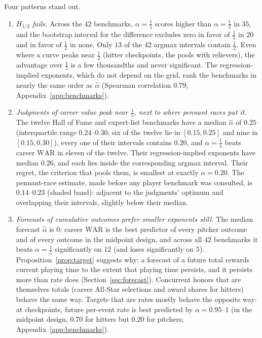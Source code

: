 \documentclass[11pt,letterpaper]{article}
\theoremstyle{plain}
\theoremstyle{definition}
\theoremstyle{remark}
\newcommand{\WAR}{\mathrm{WAR}}
\begin{document}
Four patterns stand out.
\begin{enumerate}
    \item \emph{$H_{1/2}$ fails.} Across the $42$ benchmarks, $\alpha = \tfrac15$ scores higher than $\alpha = \tfrac12$ in $35$, and the bootstrap interval for the difference excludes zero in favor of $\tfrac15$ in $20$ and in favor of $\tfrac12$ in none. Only $13$ of the $42$ argmax intervals contain $\tfrac12$. Even where a curve peaks near $\tfrac12$ (hitter checkpoints, the pools with relievers), the advantage over $\tfrac15$ is a few thousandths and never significant. The regression-implied exponents, which do not depend on the grid, rank the benchmarks in nearly the same order as $\hat\alpha$ (Spearman correlation $0.79$; Appendix~\ref{app:benchmarks}).
    \item \emph{Judgments of career value peak near $\tfrac15$, next to where pennant races put it.} The twelve Hall of Fame and expert-list benchmarks have a median $\hat\alpha$ of $0.25$ (interquartile range $0.24$--$0.30$; six of the twelve lie in $[0.15, 0.25]$ and nine in $[0.15, 0.30]$), every one of their intervals contains $0.20$, and $\alpha = \tfrac15$ beats career $\WAR$ in eleven of the twelve. Their regression-implied exponents have median $0.26$, and each lies inside the corresponding argmax interval. Their regret, the criterion that pools them, is smallest at exactly $\alpha = 0.20$. The pennant-race estimate, made before any player benchmark was consulted, is $0.14$--$0.23$ (shaded band): adjacent to the judgments' optimum and overlapping their intervals, slightly below their median.
    \item \emph{Forecasts of cumulative outcomes prefer smaller exponents still.} The median forecast $\hat\alpha$ is $0$: career $\WAR$ is the best predictor of every pitcher outcome and of every outcome in the midpoint design, and across all $42$ benchmarks it beats $\alpha = \tfrac15$ significantly on $12$ (and loses significantly on $5$). Proposition~\ref{prop:target} suggests why: a forecast of a future total rewards current playing time to the extent that playing time persists, and it persists more than rate does (Section~\ref{sec:forecast}). Concurrent honors that are themselves totals (career All-Star selections and award shares for hitters) behave the same way. Targets that are rates mostly behave the opposite way: at checkpoints, future per-event rate is best predicted by $\alpha = 0.95$--$1$ (in the midpoint design, $0.70$ for hitters but $0.20$ for pitchers; Appendix~\ref{app:benchmarks}).

\end{enumerate}
\end{document}
